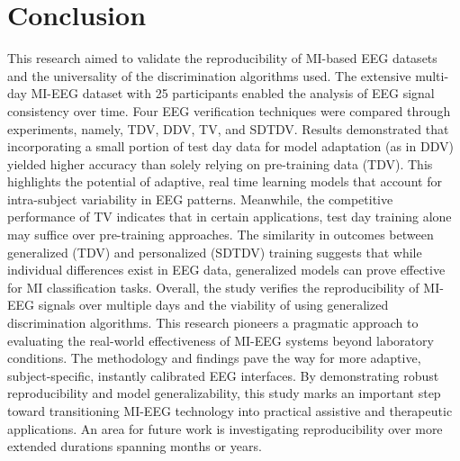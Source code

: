 \section{Conclusion}
This research aimed to validate the reproducibility of MI-based EEG datasets and the universality of the discrimination algorithms used. The extensive multi-day MI-EEG dataset with 25 participants enabled the analysis of EEG signal consistency over time. Four EEG verification techniques were compared through experiments, namely, TDV, DDV, TV, and SDTDV. Results demonstrated that incorporating a small portion of test day data for model adaptation (as in DDV) yielded higher accuracy than solely relying on pre-training data (TDV). This highlights the potential of adaptive, real time learning models that account for intra-subject variability in EEG patterns. Meanwhile, the competitive performance of TV indicates that in certain applications, test day training alone may suffice over pre-training approaches. The similarity in outcomes between generalized (TDV) and personalized (SDTDV) training suggests that while individual differences exist in EEG data, generalized models can prove effective for MI classification tasks. Overall, the study verifies the reproducibility of MI-EEG signals over multiple days and the viability of using generalized discrimination algorithms. This research pioneers a pragmatic approach to evaluating the real-world effectiveness of MI-EEG systems beyond laboratory conditions. The methodology and findings pave the way for more adaptive, subject-specific, instantly calibrated EEG interfaces. By demonstrating robust reproducibility and model generalizability, this study marks an important step toward transitioning MI-EEG technology into practical assistive and therapeutic applications. An area for future work is investigating reproducibility over more extended durations spanning months or years.